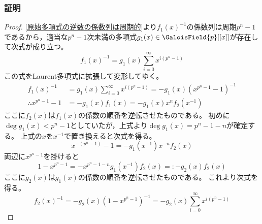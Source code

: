             \subsubsection{証明}
                \begin{proof}
                    \quad\par
                    \ref{原始多項式の逆数の係数列は周期的}より$f_1(x)^{-1}$の係数列は周期$p^n-1$であるから，適当な$p^n-1$次未満の多項式$g_1(x) \in \GaloisField{p}[[x]]$が存在して次式が成り立つ。
                    \[ f_1(x)^{-1} = g_1(x) \sum_{i=0}^\infty x^{i(p^n-1)} \]
                    この式をLaurent多項式に拡張して変形してゆく。
                    \begin{align*}
                        f_1(x)^{-1} &= g_1(x) \sum_{i=0}^\infty x^{i(p^n-1)} = -g_1(x) \left(x^{p^n-1} - 1\right)^{-1} \\
                        \therefore x^{p^n-1} - 1 &= -g_1(x)f_1(x) = -g_1(x) x^n f_2(x^{-1})
                    \end{align*}
                    ここに$f_2(x)$は$f_1(x)$の係数の順番を逆転させたものである。
                    初めに$\deg g_1(x) < p^n-1$としていたが，上式より$\deg g_1(x) = p^n-1-n$が確定する。
                    上式の$x$を$x^{-1}$で置き換えると次式を得る。
                    \[ x^{-(p^n-1)} - 1 = -g_1(x^{-1}) x^{-n} f_2(x) \]
                    両辺に$x^{p^n-1}$を掛けると
                    \[ 1 - x^{p^n-1} = -x^{p^n-1-n}g_1(x^{-1}) f_2(x) =: -g_2(x)f_2(x) \]
                    ここに$g_2(x)$は$g_1(x)$の係数の順番を逆転させたものである。
                    これより次式を得る。
                    \[ f_2(x)^{-1} = -g_2(x) \left(1 - x^{p^n-1}\right)^{-1} = -g_2(x) \sum_{i=0}^\infty x^{i(p^n-1)} \]
                \end{proof}